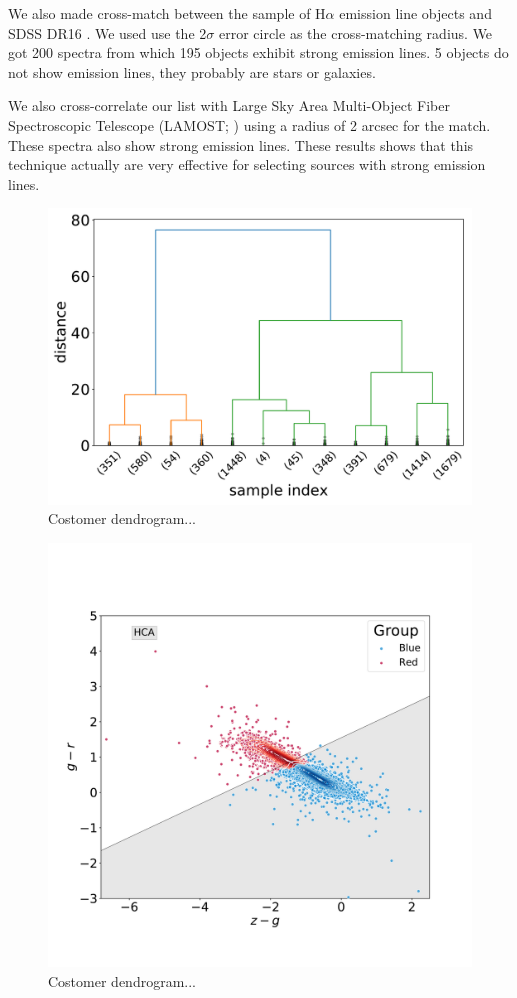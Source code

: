 \documentclass[fleqn,usenatbib]{mnras}
\begin{document}
{We also made cross-match between the sample of H{$\alpha$} emission line objects and SDSS DR16
\citep{Ahumada:2020}. We used use the 2$\sigma$ error circle as the cross-matching radius.
We got 200 spectra from which 195 objects exhibit strong emission lines. 5 objects do not show
emission lines, they probably are stars or galaxies.

We also cross-correlate our list with Large Sky Area Multi-Object Fiber Spectroscopic Telescope
(LAMOST; \citealp{Wu:2011}) using a radius of 2 arcsec for the match.  These spectra also
show strong emission lines. These results shows that this technique actually are very effective
for selecting sources with strong emission lines.


\begin{figure}
	\includegraphics[width=0.9\linewidth]{Figs/Customer-Dendrograms.pdf}
    \caption{Costomer dendrogram...}
    \label{fig:dendrogram}
\end{figure}

\begin{figure}
	\includegraphics[width=0.9\linewidth]{Figs/blued-red-hierarchical.pdf}
    \caption{Costomer dendrogram...}
    \label{fig:hierar}
\end{figure}

}
\end{document}
